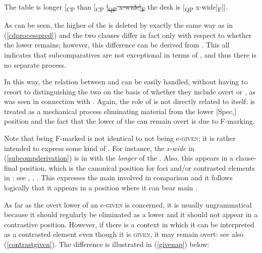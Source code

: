 \ea	The table is longer [\textsubscript{CP} than [\textsubscript{CP} \sout{[\textsubscript{QP} x-wide]\textsubscript{F}} the desk is [\textsubscript{QP} x-wide]\textsubscript{F}]]. \label{subcompderivation}
\z

As can be seen, the higher  of the  is deleted by  exactly the same way as in (\ref{cdprocesspred}) and the two clauses differ in fact only with respect to whether the lower  remains; however, this difference can be derived from . This all indicates that subcomparatives are not exceptional in terms of , and thus there is no separate  process.

In this way, the relation between  and  can be easily handled, without having to resort to distinguishing the two on the basis of whether they include overt or , as was seen in connection with \citet{kennedy2002}. Again, the role of  is not directly related to  itself:  is treated as a mechanical process eliminating material from the lower [Spec,] position and the fact that the lower  of the  can remain overt is due to F-marking.

Note that being F-marked is not identical to not being e-\textsc{given}; it is rather intended to express some kind of . For instance, the  \textit{x-wide} in (\ref{subcompderivation}) is in  with the  \textit{longer} of the . Also, this  appears in a clause-final position, which is the canonical position for foci and/or contrasted elements in : see \citet{selkirk1984, selkirk1986}, \citet{nesporvogel1986}, \citet{mccarthyprince1993}. This  expresses the main  involved in comparison and it follows logically that it appears in a position where it can bear main .

As far as the overt lower  of an e-\textsc{given}  is concerned, it is usually ungrammatical because it should regularly be eliminated as a lower  and it should not appear in a contrastive position. However, if there is a context in which it can be interpreted as a contrasted element  even though it is \textsc{given}, it may remain overt: see also (\ref{contrastgiven}). The difference is illustrated in (\ref{givenap}) below:

